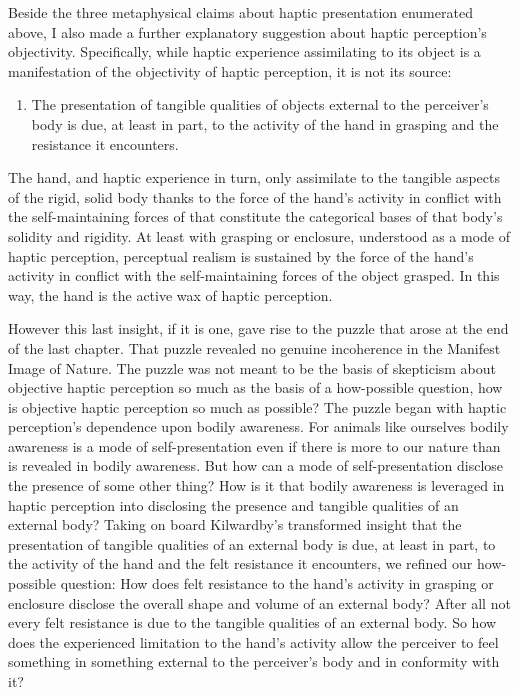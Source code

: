 Beside the three metaphysical claims about haptic presentation enumerated above, I also made a further explanatory suggestion about haptic perception's objectivity. Specifically, while haptic experience assimilating to its object is a manifestation of the objectivity of haptic perception, it is not its source: 
\begin{enumerate}[(4)]
	\item The presentation of tangible qualities of objects external to the perceiver’s body is due, at least in part, to the activity of the hand in grasping and the resistance it encounters.
\end{enumerate}
The hand, and haptic experience in turn, only assimilate to the tangible aspects of the rigid, solid body thanks to the force of the hand’s activity in conflict with the self-maintaining forces of that constitute the categorical bases of that body’s solidity and rigidity. At least with grasping or enclosure, understood as a mode of haptic perception, perceptual realism is sustained by the force of the hand’s activity in conflict with the self-maintaining forces of the object grasped. In this way, the hand is the active wax of haptic perception.

However this last insight, if it is one, gave rise to the puzzle that arose at the end of the last chapter. That puzzle revealed no genuine incoherence in the Manifest Image of Nature. The puzzle was not meant to be the basis of skepticism about objective haptic perception so much as the basis of a how-possible question, how is objective haptic perception so much as possible? The puzzle began with haptic perception's dependence upon bodily awareness. For animals like ourselves bodily awareness is a mode of self-presentation even if there is more to our nature than is revealed in bodily awareness. But how can a mode of self-presentation disclose the presence of some other thing? How is it that bodily awareness is leveraged in haptic perception into disclosing the presence and tangible qualities of an external body? Taking on board Kilwardby's transformed insight that the presentation of tangible qualities of an external body is due, at least in part, to the activity of the hand and the felt resistance it encounters, we refined our how-possible question: How does felt resistance to the hand's activity in grasping or enclosure disclose the overall shape and volume of an external body? After all not every felt resistance is due to the tangible qualities of an external body. So how does the experienced limitation to the hand's activity allow the perceiver to feel something in something external to the perceiver's body and in conformity with it?

